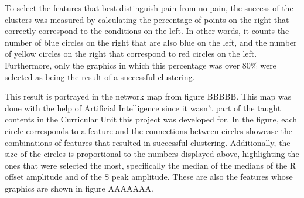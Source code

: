 To select the features that best distinguish pain from no pain, the success of the clusters was measured by calculating the percentage of points on the right that correctly correspond to the conditions on the left. In other words, it counts the number of blue circles on the right that are also blue on the left, and the number of yellow circles on the right that correspond to red circles on the left. Furthermore, only the graphics in which this percentage was over 80\% were selected as being the result of a successful clustering.

This result is portrayed in the network map from figure BBBBB. This map was done with the help of Artificial Intelligence since it wasn’t part of the taught contents in the Curricular Unit this project was developed for. In the figure, each circle corresponds to a feature and the connections between circles showcase the combinations of features that resulted in successful clustering. Additionally, the size of the circles is proportional to the numbers displayed above, highlighting the ones that were selected the most, specifically the median of the medians of the R offset amplitude and of the S peak amplitude. These are also the features whose graphics are shown in figure AAAAAAA.

